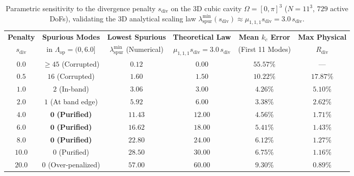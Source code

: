 \documentclass[preprint,12pt]{elsarticle}
\begin{document}
\begin{table}[htbp]
\centering
\caption{Parametric sensitivity to the divergence penalty $s_{\text{div}}$ on the 3D cubic cavity $\Omega = [0,\pi]^3$ ($N=11^3$, $729$ active DoFs), validating the 3D analytical scaling law $\lambda_{\text{spur}}^{\min}(s_{\text{div}}) \approx \mu_{1,1,1}s_{\text{div}} = 3.0\,s_{\text{div}}$.}
\label{tab:sdiv_sensitivity_3d}
\footnotesize
\begin{tabular}{cccccc}
\toprule
\textbf{Penalty} & \textbf{Spurious Modes} & \textbf{Lowest Spurious} & \textbf{Theoretical Law} & \textbf{Mean $k_c$ Error} & \textbf{Max Physical} \\
$s_{\text{div}}$ & in $\Lambda_{\text{op}} = (0, 6.0]$ & $\lambda_{\text{spur}}^{\min}$ (Numerical) & $\mu_{1,1,1}s_{\text{div}} = 3.0\,s_{\text{div}}$ & (First 11 Modes) & $R_{\text{div}}$ \\
\midrule
$0.0$  & $\ge 45$ (Corrupted) & $0.12$  & $0.00$  & $55.57\%$ & --- \\
$0.5$  & $16$ (Corrupted)     & $1.60$  & $1.50$  & $10.22\%$ & $17.87\%$ \\
$1.0$  & $2$ (In-band)        & $3.06$  & $3.00$  & $4.26\%$  & $5.10\%$ \\
$2.0$  & $1$ (At band edge)   & $5.92$  & $6.00$  & $3.38\%$  & $2.62\%$ \\
$\mathbf{4.0}$  & $\mathbf{0}$ \textbf{(Purified)} & $\mathbf{11.43}$ & $\mathbf{12.00}$ & $\mathbf{4.56\%}$  & $\mathbf{1.71\%}$ \\
$\mathbf{6.0}$  & $\mathbf{0}$ \textbf{(Purified)} & $\mathbf{16.62}$ & $\mathbf{18.00}$ & $\mathbf{5.41\%}$  & $\mathbf{1.43\%}$ \\
$\mathbf{8.0}$  & $\mathbf{0}$ \textbf{(Purified)} & $\mathbf{22.80}$ & $\mathbf{24.00}$ & $\mathbf{6.12\%}$  & $\mathbf{1.27\%}$ \\
$10.0$ & $0$ (Purified)       & $28.50$ & $30.00$ & $6.75\%$  & $1.16\%$ \\
$20.0$ & $0$ (Over-penalized) & $57.00$ & $60.00$ & $9.30\%$  & $0.89\%$ \\
\bottomrule
\end{tabular}
\end{table}
\end{document}
